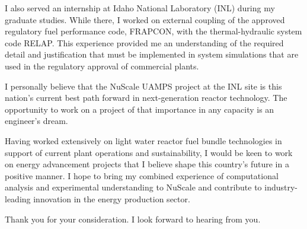 \documentclass[11pt,letterpaper,roman]{moderncv}        %
\makeatletter
\renewcommand*{\makeletterclosing}{
	\@closing\\[0em]%
	{%
		\par
		\bfseries \@firstname~\@lastname}%
		\\
	\ifthenelse{\isundefined{\@enclosure}}{}{%
		\vfill%
		{\color{color2}\itshape\enclname: \@enclosure}}}
\makeatother
\begin{document}
I also served an internship at Idaho National Laboratory (INL) during my graduate studies. While there, I worked on external coupling of the approved regulatory fuel performance code, FRAPCON, with the thermal-hydraulic system code RELAP. This experience provided me an understanding of the required detail and justification that must be implemented in system simulations that are used in the regulatory approval of commercial plants.

I personally believe that the NuScale UAMPS project at the INL site is this nation's current best path forward in next-generation reactor technology. The opportunity to work on a project of that importance in any capacity is an engineer's dream.

Having worked extensively on light water reactor fuel bundle technologies in support of current plant operations and sustainability, I would be keen to work on energy advancement projects that I believe shape this country’s future in a positive manner. I hope to bring my combined experience of computational analysis and experimental understanding to NuScale and contribute to industry-leading innovation in the energy production sector.


Thank you for your consideration. I look forward to hearing from you.

\makeletterclosing
\end{document}
